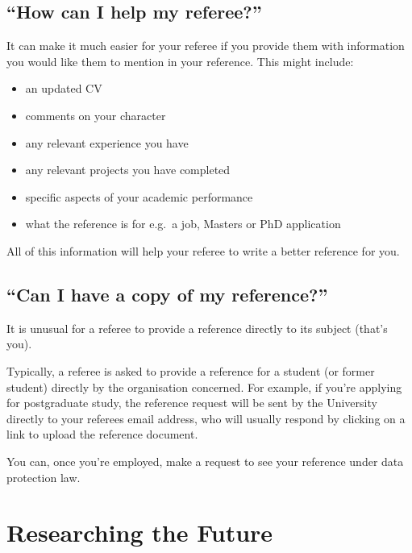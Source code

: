 \documentclass[
  12pt,
]{book}
\providecommand{\tightlist}{%
  \setlength{\itemsep}{0pt}\setlength{\parskip}{0pt}}
\begin{document}
\section{``How can I help my referee?''}\label{help}

It can make it much easier for your referee if you provide them with information you would like them to mention in your reference. This might include:

\begin{itemize}
\tightlist
\item
  an updated CV\\
\item
  comments on your character
\item
  any relevant experience you have
\item
  any relevant projects you have completed
\item
  specific aspects of your academic performance
\item
  what the reference is for e.g.~a job, Masters or PhD application
\end{itemize}

All of this information will help your referee to write a better reference for you.

\section{``Can I have a copy of my reference?''}\label{copy}

It is unusual for a referee to provide a reference directly to its subject (that's you).

Typically, a referee is asked to provide a reference for a student (or former student) directly by the organisation concerned. For example, if you're applying for postgraduate study, the reference request will be sent by the University directly to your referees email address, who will usually respond by clicking on a link to upload the reference document.

You can, once you're employed, make a request to see your reference under data protection law.

\chapter{Researching the Future}\label{research}
\end{document}

